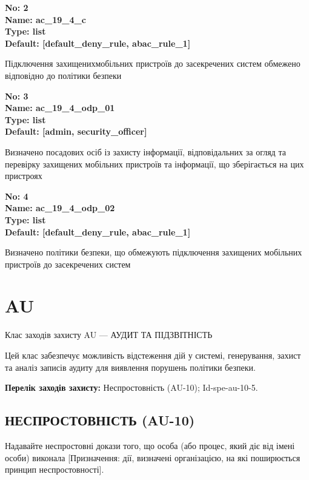 \documentclass{article}
\begin{document}
{\footnotesize\bfseries
No: 2\\
Name: ac\_\allowbreak{}19\_\allowbreak{}4\_\allowbreak{}c\\
Type: list\\
Default: [\textquotedbl{}default\_\allowbreak{}deny\_\allowbreak{}rule\textquotedbl{}, \textquotedbl{}abac\_\allowbreak{}rule\_\allowbreak{}1\textquotedbl{}]
}

{\footnotesize Підключення захищенихмобільних пристроїв до засекречених систем обмежено відповідно до політики безпеки}


{\footnotesize\bfseries
No: 3\\
Name: ac\_\allowbreak{}19\_\allowbreak{}4\_\allowbreak{}odp\_\allowbreak{}01\\
Type: list\\
Default: [\textquotedbl{}admin\textquotedbl{}, \textquotedbl{}security\_\allowbreak{}officer\textquotedbl{}]
}

{\footnotesize Визначено посадових осіб із захисту інформації, відповідальних за огляд та перевірку захищених мобільних пристроїв та інформації, що зберігається на цих пристроях}


{\footnotesize\bfseries
No: 4\\
Name: ac\_\allowbreak{}19\_\allowbreak{}4\_\allowbreak{}odp\_\allowbreak{}02\\
Type: list\\
Default: [\textquotedbl{}default\_\allowbreak{}deny\_\allowbreak{}rule\textquotedbl{}, \textquotedbl{}abac\_\allowbreak{}rule\_\allowbreak{}1\textquotedbl{}]
}

{\footnotesize Визначено політики безпеки, що обмежують підключення захищених мобільних пристроїв до засекречених систем}




\section{AU}
Клас заходів захисту AU --- АУДИТ ТА ПІДЗВІТНІСТЬ

Цей клас забезпечує можливість відстеження дій у системі, генерування, захист та аналіз записів аудиту для виявлення порушень політики безпеки.

\textbf{Перелік заходів захисту:} Неспростовність (AU-10); Id-spe-au-10-5.

\subsection{НЕСПРОСТОВНІСТЬ (AU-10)}
Надавайте неспростовні докази того, що особа (або процес, який діє від імені особи) виконала [Призначення: дії, визначені організацією, на які поширюється принцип неспростовності].
\end{document}
